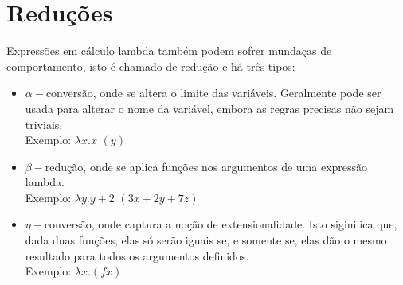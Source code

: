 \documentclass{article}
\begin{document}
\newpage
\section*{Reduções}
Expressões em cálculo lambda também podem sofrer mundaças de comportamento, isto é chamado de redução e há três tipos:
\begin{itemize}
    \item $\alpha-$conversão, onde se altera o limite das variáveis. Geralmente pode ser usada para alterar o nome da variável, embora as regras precisas não sejam triviais. \\
    Exemplo: $\lambda x.x$ $(y)$
    \item $\beta-$redução, onde se aplica funções nos argumentos de uma expressão lambda. \\ 
    Exemplo: $\lambda y.y +2$ $(3x+2y+7z)$
    \item $\eta-$conversão, onde captura a noção de extensionalidade. Isto siginifica que, dada duas funções, elas só serão iguais se, e somente se, elas dão o mesmo resultado para todos os argumentos definidos. \\
    Exemplo: $\lambda x.(f x)$
\end{itemize}
\end{document}
